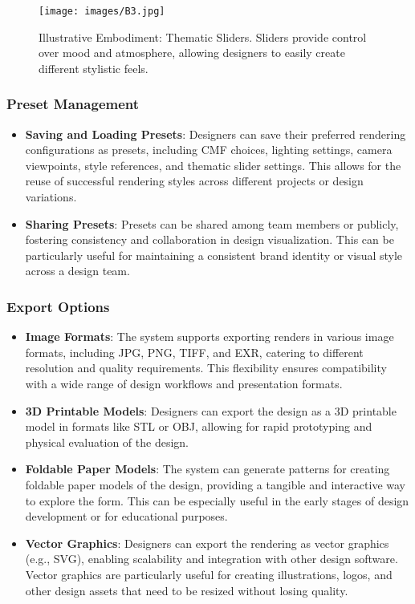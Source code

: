 \begin{figure}
\centering
\texttt{[image: images/B3.jpg]}
\caption{Illustrative Embodiment: Thematic Sliders. Sliders provide control over mood and atmosphere, allowing designers to easily create different stylistic feels.}
\label{fig:thematic-sliders}
\end{figure}

\subsubsection{Preset Management}
\begin{itemize}
\item \textbf{Saving and Loading Presets}: Designers can save their preferred rendering configurations as presets, including CMF choices, lighting settings, camera viewpoints, style references, and thematic slider settings. This allows for the reuse of successful rendering styles across different projects or design variations.
\item \textbf{Sharing Presets}: Presets can be shared among team members or publicly, fostering consistency and collaboration in design visualization. This can be particularly useful for maintaining a consistent brand identity or visual style across a design team.
\end{itemize}

\subsubsection{Export Options}
\begin{itemize}
\item \textbf{Image Formats}: The system supports exporting renders in various image formats, including JPG, PNG, TIFF, and EXR, catering to different resolution and quality requirements. This flexibility ensures compatibility with a wide range of design workflows and presentation formats.
\item \textbf{3D Printable Models}: Designers can export the design as a 3D printable model in formats like STL or OBJ, allowing for rapid prototyping and physical evaluation of the design.
\item \textbf{Foldable Paper Models}: The system can generate patterns for creating foldable paper models of the design, providing a tangible and interactive way to explore the form. This can be especially useful in the early stages of design development or for educational purposes.
\item \textbf{Vector Graphics}: Designers can export the rendering as vector graphics (e.g., SVG), enabling scalability and integration with other design software. Vector graphics are particularly useful for creating illustrations, logos, and other design assets that need to be resized without losing quality.
\end{itemize}

